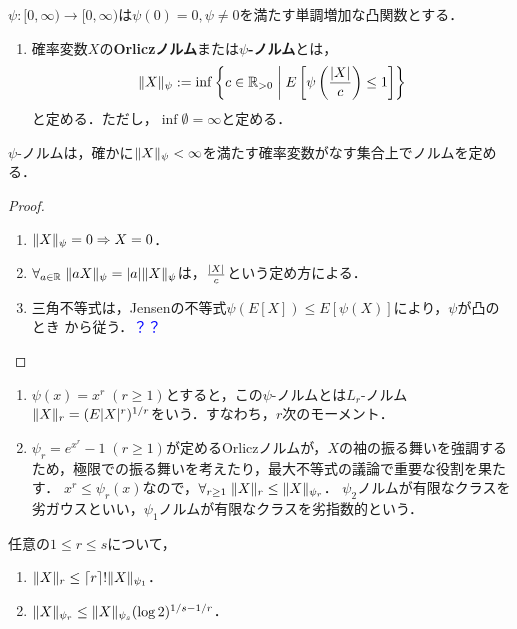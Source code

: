 \documentclass[uplatex,dvipdfmx]{jsreport}
\begin{document}
\begin{definition}
    $\psi:[0,\infty)\to[0,\infty)$は$\psi(0)=0,\psi\ne 0$を満たす単調増加な凸関数とする．
    \begin{enumerate}
        \item 確率変数$X$の\textbf{Orliczノルム}または\textbf{$\psi$-ノルム}とは，
        \[\|X\|_\psi:=\inf\left\{c\in\mathbb{R}_{>0}\;\middle|\;E\left[\psi\left(\frac{\lvert X\rvert}{c}\right)\le 1\right]\right\}\]
        と定める．ただし，$\inf\emptyset=\infty$と定める．
    \end{enumerate}
\end{definition}

\begin{lemma}
    $\psi$-ノルムは，確かに$\|X\|_\psi<\infty$を満たす確率変数がなす集合上でノルムを定める．
\end{lemma}
\begin{proof}\mbox{}
    \begin{enumerate}
        \item $\|X\|_\psi=0\Rightarrow X=0$．
        \item $\forall_{a\in\mathbb{R}}\;\|aX\|_\psi=\lvert a\rvert\|X\|_\psi$は，$\frac{\lvert X\rvert}{c}$という定め方による．
        \item 三角不等式は，Jensenの不等式$\psi(E[X])\le E[\psi(X)]$により，$\psi$が凸のとき
        から従う．\textcolor{blue}{？？}
    \end{enumerate}
\end{proof}

\begin{example}\mbox{}
    \begin{enumerate}
        \item $\psi(x)=x^r\;(r\ge 1)$とすると，この$\psi$-ノルムとは$L_r$-ノルム$\|X\|_r=(E\lvert X\rvert^r)^{1/r}$をいう．すなわち，$r$次のモーメント．
        \item $\psi_r=e^{x^r}-1\;(r\ge 1)$が定めるOrliczノルムが，$X$の袖の振る舞いを強調するため，極限での振る舞いを考えたり，最大不等式の議論で重要な役割を果たす．
        $x^r\le\psi_r(x)$なので，$\forall_{r\ge 1}\;\|X\|_r\le\|X\|_{\psi_r}$．
        $\psi_2$ノルムが有限なクラスを劣ガウスといい，$\psi_1$ノルムが有限なクラスを劣指数的という．
    \end{enumerate}
\end{example}

\begin{proposition}[OrliczノルムとLノルム]\label{prop-Orlicz-norm-L-norm}
    任意の$1\le r\le s$について，
    \begin{enumerate}
        \item $\|X\|_r\le\lceil r\rceil!\|X\|_{\psi_1}$．
        \item $\|X\|_{\psi_r}\le\|X\|_{\psi_s}(\log2)^{1/s-1/r}$．
    \end{enumerate}
\end{proposition}
\end{document}

